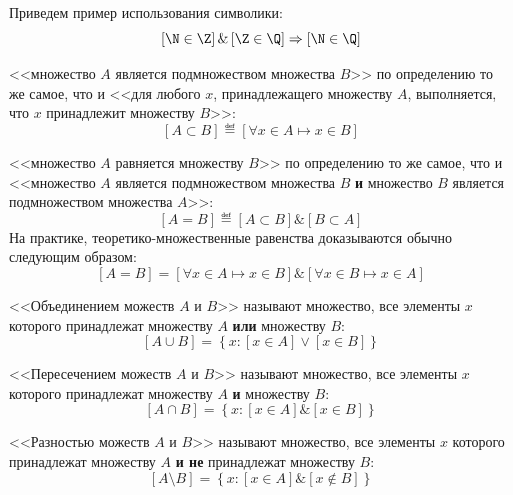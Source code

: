 \begin{example}
Приведем пример использования символики:
\[
    \left[\N \in \Z\right] \& \left[\Z \in \Q\right] \Rightarrow \left[\N \in \Q\right]
\]
\end{example}


\begin{example}
<<множество \(A\) является подмножеством множества \(B\)>> по определению то же самое, что и <<для
любого \(x\), принадлежащего множеству \(A\), выполняется, что \(x\) принадлежит множеству \(B\)>>:
\[
    \left[A \subset B\right] \eqdef \left[\forall x \in A \mapsto x \in B\right]
\]
\end{example}

\begin{example}
<<множество \(A\) равняется множеству \(B\)>> по определению то же самое, что и <<множество \(A\)
является подмножеством множества \(B\) \textbf{и} множество \(B\) является подмножеством множества
\(A\)>>:
\[
    \left[A = B\right] \eqdef \left[A \subset B\right] \& \left[B \subset A\right]
\]
На практике, теоретико-множественные равенства доказываются обычно следующим образом:
\[
    \left[A = B\right] = \left[\forall x \in A \mapsto x \in B\right] \&
    \left[\forall x \in B \mapsto x \in A\right]
\]
\end{example}

\begin{example}
<<Объединением можеств \(A\) и \(B\)>> называют множество, все элементы \(x\) которого принадлежат
множеству \(A\) \textbf{или} множеству \(B\):
\[
    \left[A \cup B\right] = \left\{x : \left[x \in A\right] \lor \left[x \in B\right]\right\}
\]
\end{example}

\begin{example}
<<Пересечением можеств \(A\) и \(B\)>> называют множество, все элементы \(x\) которого принадлежат
множеству \(A\) \textbf{и} множеству \(B\):
\[
    \left[A \cap B\right] = \left\{x : \left[x \in A\right] \& \left[x \in B\right]\right\}
\]
\end{example}

\begin{example}
<<Разностью можеств \(A\) и \(B\)>> называют множество, все элементы \(x\) которого
    принадлежат множеству \(A\) \textbf{и не} принадлежат множеству \(B\):
\[
    \left[A \setminus B\right] = \left\{x : \left[x \in A\right] \&
    \left[x \not\in B\right]\right\}
\]
\end{example}

